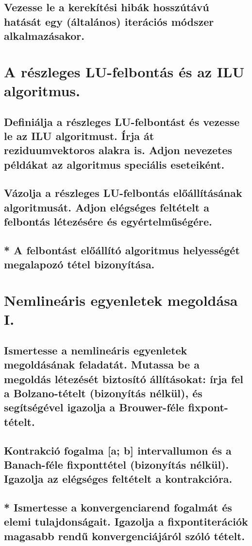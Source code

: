 \documentclass{article}
\begin{document}
        \subsection{Vezesse le a kerekítési hibák hosszútávú hatását egy (általános) iterációs módszer alkalmazásakor.}


    \section{A részleges LU-felbontás és az ILU algoritmus.}
        \subsection{Definiálja a részleges LU-felbontást és vezesse le az ILU algoritmust. Írja át reziduumvektoros alakra is. Adjon nevezetes példákat az algoritmus speciális eseteiként.}
        \subsection{Vázolja a részleges LU-felbontás előállításának algoritmusát. Adjon elégséges feltételt a felbontás létezésére és egyértelműségére.}
        \subsection{* A felbontást előállító algoritmus helyességét megalapozó tétel bizonyítása.}


    \section{Nemlineáris egyenletek megoldása I.}
        \subsection{Ismertesse a nemlineáris egyenletek megoldásának feladatát. Mutassa be a megoldás létezését biztosító állításokat: írja fel a Bolzano-tételt (bizonyítás nélkül), és segítségével igazolja a Brouwer-féle fixpont-tételt.}
        \subsection{Kontrakció fogalma [a; b] intervallumon és a Banach-féle fixponttétel (bizonyítás nélkül). Igazolja az elégséges feltételt a kontrakcióra.}
        \subsection{* Ismertesse a konvergenciarend fogalmát és elemi tulajdonságait. Igazolja a fixpontiterációk magasabb rendű konvergenciájáról szóló tételt.}
\end{document}
